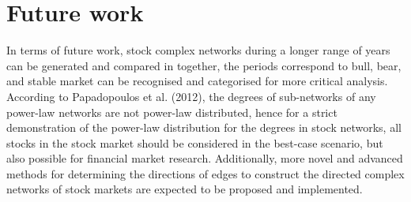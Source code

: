 
\section{Future work}
In terms of future work, stock complex networks during a longer range of years can be generated and compared in together, the periods correspond to bull, bear, and stable market can be recognised and categorised for more critical analysis. According to Papadopoulos et al. (2012), the degrees of sub-networks of any power-law networks are not power-law distributed\cite{papadopoulos2012popularity}, hence for a strict demonstration of the power-law distribution for the degrees in stock networks, all stocks in the stock market should be considered in the best-case scenario, but also possible for financial market research. Additionally, more novel and advanced methods for determining the directions of edges to construct the directed complex networks of stock markets are expected to be proposed and implemented.
